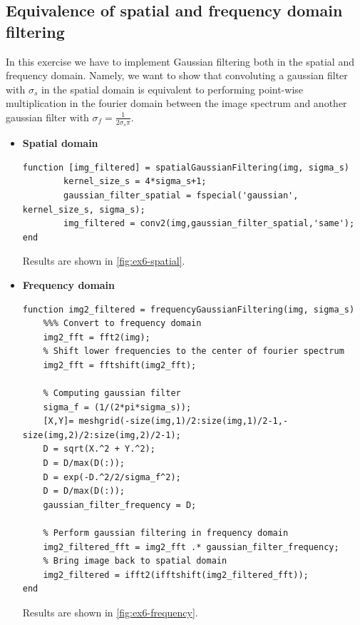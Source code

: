 \documentclass[tikz,14pt,fleqn]{article}
\begin{document}
\subsection{Equivalence of spatial and frequency domain filtering}
In this exercise we have to implement Gaussian filtering both in the spatial and frequency domain. Namely, we want to show that convoluting a gaussian filter with $\sigma_s$ in the spatial domain is equivalent to performing point-wise multiplication in the fourier domain between the image spectrum and another gaussian filter with $\sigma_f = \frac{1}{2\sigma_s \pi}$.
\begin{itemize}
    \item \textbf{Spatial domain}
\begin{verbatim} 
function [img_filtered] = spatialGaussianFiltering(img, sigma_s)
        kernel_size_s = 4*sigma_s+1;
        gaussian_filter_spatial = fspecial('gaussian', kernel_size_s, sigma_s);
        img_filtered = conv2(img,gaussian_filter_spatial,'same');
end
\end{verbatim}
Results are shown in \autoref{fig:ex6-spatial}.
    \item \textbf{Frequency domain}
\begin{verbatim} 
function img2_filtered = frequencyGaussianFiltering(img, sigma_s)
    %%% Convert to frequency domain
    img2_fft = fft2(img);
    % Shift lower frequencies to the center of fourier spectrum
    img2_fft = fftshift(img2_fft);

    % Computing gaussian filter
    sigma_f = (1/(2*pi*sigma_s));
    [X,Y]= meshgrid(-size(img,1)/2:size(img,1)/2-1,-size(img,2)/2:size(img,2)/2-1);
    D = sqrt(X.^2 + Y.^2);
    D = D/max(D(:));
    D = exp(-D.^2/2/sigma_f^2);
    D = D/max(D(:));
    gaussian_filter_frequency = D;

    % Perform gaussian filtering in frequency domain
    img2_filtered_fft = img2_fft .* gaussian_filter_frequency;
    % Bring image back to spatial domain
    img2_filtered = ifft2(ifftshift(img2_filtered_fft));
end
\end{verbatim}
Results are shown in \autoref{fig:ex6-frequency}.
\end{itemize}
\end{document}
